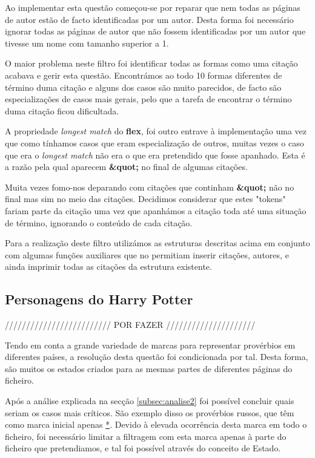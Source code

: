 \documentclass[11pt,a4paper]{report}
\begin{document}
Ao implementar esta questão começou-se por reparar que nem todas as páginas de autor estão de facto identificadas por um autor. Desta forma foi necessário ignorar todas as páginas de autor que não fossem identificadas por um autor que tivesse um nome com tamanho superior a 1.

O maior problema neste filtro foi identificar todas as formas como uma citação acabava e gerir esta questão. Encontrámos ao todo 10 formas diferentes de término duma citação e alguns dos casos são muito parecidos, de facto são especializações de casos mais gerais, pelo que a tarefa de encontrar o término duma citação ficou dificultada.

A propriedade \emph{longest match} do \textbf{flex}, foi outro entrave à implementação uma vez que como tínhamos casos que eram especialização de outros, muitas vezes o caso que era o \emph{longest match} não era o que era pretendido que fosse apanhado. Esta é a razão pela qual aparecem \textbf{\&quot;} no final de algumas citações.

Muita vezes fomo-nos deparando com citações que continham \textbf{\&quot;} não no final mas sim no meio das citações. Decidimos considerar que estes "tokens"  fariam parte da citação uma vez que apanhámos a citação toda até uma situação de término, ignorando o conteúdo de cada citação.

Para a realização deste filtro utilizámos as estruturas descritas acima em conjunto com algumas funções auxiliares que no permitiam inserir citações, autores, e ainda imprimir todas as citações da estrutura existente.


\subsection{Personagens do Harry Potter}

///////////////////////// POR FAZER /////////////////////

Tendo em conta a grande variedade de marcas para representar provérbios em diferentes países, a resolução desta questão foi condicionada por tal. Desta forma, são muitos os estados criados para as mesmas partes de diferentes páginas do ficheiro.

Após a análise explicada na secção \ref{subsec:analise2} foi possível concluir quais seriam os casos mais críticos. São exemplo disso os provérbios russos, que têm como marca inicial apenas \underline{*}. Devido à elevada ocorrência desta marca em todo o ficheiro, foi necessário limitar a filtragem com esta marca apenas à parte do ficheiro que pretendiamos, e tal foi possível através do conceito de Estado.
\end{document}
